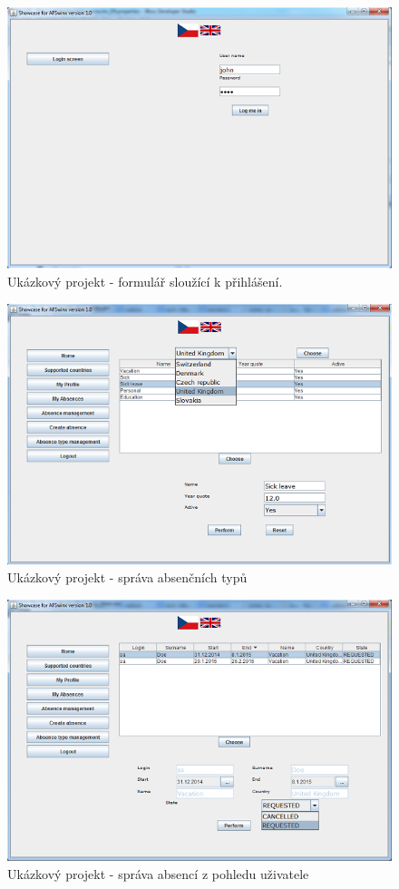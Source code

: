\documentclass[11pt,twoside,a4paper]{book}
\begin{document}
\begin{figure}
\includegraphics{images/login}
\caption{Ukázkový projekt - formulář sloužící k přihlášení.}
\label{img:loginView}
\end{figure}	

\begin{figure}
\includegraphics{images/AbsenceType}
\caption{Ukázkový projekt - správa absenčních typů}
\label{img:AbsenceType}
\end{figure}	

\begin{figure}
\includegraphics{images/AbsenceManagement}
\caption{Ukázkový projekt - správa absencí z pohledu uživatele}
\label{img:AbsenceManagement}
\end{figure}	
\end{document}
